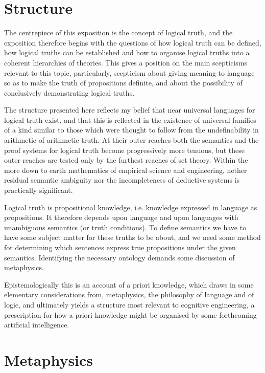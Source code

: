 \documentclass[10pt,titlepage]{book}
\begin{document}
\section{Structure}

The centrepiece of this exposition is the concept of logical truth, and the exposition therefore begins with the questions of how logical truth can be defined, how logical truths can be established and how to organise logical truths into a coherent hierarchies of theories.
This gives a position on the main scepticisms relevant to this topic, particularly, scepticism about giving meaning to language so as to make the truth of propositions definite, and about the possibility of conclusively demonstrating logical truths.

The structure presented here reflects my belief that near universal languages for logical truth exist, and that this is reflected in the existence of universal families of a kind similar to those which were thought to follow from the undefinability in arithmetic of arithmetic truth.
At their outer reaches both the semantics and the proof systems for logical truth become progressively more tenuous, but these outer reaches are tested only by the furthest reaches of set theory.
Within the more down to earth mathematics of empirical science and engineering, nether residual semantic ambiguity nor the incompleteness of deductive systems is practically significant.

Logical truth is propositional knowledge, i.e. knowledge expressed in language as propositions.
It therefore depends upon language and upon languages with unambiguous semantics (or truth conditions).
To define semantics we have to have some subject matter for these truths to be about, and we need some method for determining which sentences express true propositions under the given semantics.
Identifying the necessary ontology demands some discussion of metaphysics.

Epistemologically this is an account of a priori knowledge, which draws in some elementary considerations from, metaphysics, the philosophy of language and of logic, and ultimately yields a structure most relevant to cognitive engineering, a prescription for how a priori knowledge might be organised by some forthcoming artificial intelligence.

\section{Metaphysics}
\end{document}
